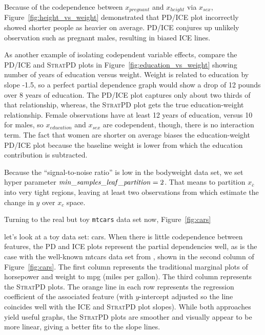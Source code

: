 \documentclass[12pt]{article}
\newcommand{\figref}[1]{Figure~\ref{#1}}
\newcommand{\cut}[1]{}
\newcommand{\spd}{\fontfamily{cmr}\textsc{\small StratPD}}
\newcommand{\xnc}{$x_{\overline{c}}$}
\begin{document}
\cut{
def toy_weight_data(n):
    df = pd.DataFrame()
    nmen = n//2
    nwomen = n//2
    df['sex'] = ['M']*nmen + ['F']*nwomen
    df.loc[df['sex']=='F','pregnant'] = np.random.randint(0,2,size=(nwomen,))
    df.loc[df['sex']=='M','pregnant'] = 0
    df.loc[df['sex']=='M','height'] = 5*12+8 + np.random.uniform(-7, +8, size=(nmen,))
    df.loc[df['sex']=='F','height'] = 5*12+5 + np.random.uniform(-4.5, +5, size=(nwomen,))
    df.loc[df['sex']=='M','education'] = 10 + np.random.randint(0,8,size=nmen)
    df.loc[df['sex']=='F','education'] = 12 + np.random.randint(0,8,size=nwomen)
}

Because of the codependence between $x_{pregnant}$ and $x_{height}$ via $x_{sex}$, \figref{fig:height_vs_weight} demonstrated that PD/ICE plot incorrectly showed shorter people as heavier on average. PD/ICE conjures up unlikely observation such as pregnant males, resulting in biased ICE lines.

As another example of isolating codependent variable effects, compare the PD/ICE and \spd{} plots in \figref{fig:education_vs_weight} showing number of years of education versus weight. Weight is related to education by slope -1.5, so a perfect partial dependence graph would show a drop of 12 pounds over 8 years of education. The PD/ICE plot captures only about two thirds of that relationship, whereas, the \spd{} plot gets the true education-weight relationship.  Female observations have at least 12 years of education, versus 10 for males, so $x_{education}$ and $x_{sex}$ are codependent, though, there is no interaction term. The fact that women are shorter on average biases the education-weight PD/ICE plot because the baseline weight is lower from which the education contribution is  subtracted.  

Because the ``signal-to-noise ratio'' is low in the bodyweight data set, we set hyper parameter ${\it min\_samples\_leaf\_partition}=2$. That means to partition \xnc{} into very tight regions, leaving at least two observations from which estimate the change in $y$ over $x_c$ space.

Turning to the real but toy {\tt mtcars} data set \cite{mtcars} now, \figref{fig:cars}

let's look at a toy data set: cars. When there is little codependence between features, the PD and ICE plots represent the partial dependencies well, as is the case with the well-known mtcars data set from \cite{mtcars}, shown in the second column of \figref{fig:cars}.  The first column represents the traditional marginal plots of horsepower and weight to mpg (miles per gallon). The third column represents the \spd{} plots. The orange line in each row represents the regression coefficient of the associated feature (with $y$-intercept adjusted so the line coincides well with the ICE and \spd{} plot slopes).  While both approaches yield useful graphs, the \spd{} plots are smoother and visually appear to be more linear, giving a better fits to the slope lines.
\end{document}
